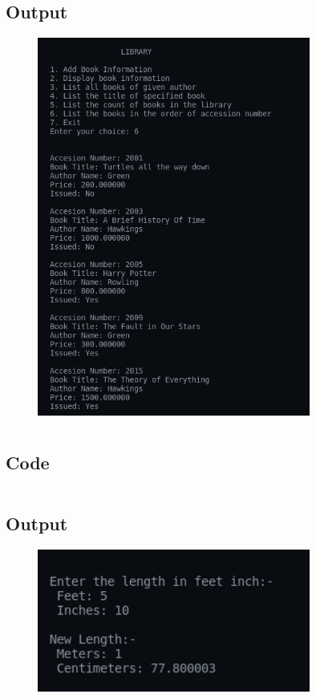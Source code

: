 \documentclass[12pt]{article}
\begin{document}
\subsection{Output}
\begin{figure}[h]
    \centering
    \includegraphics[width=0.8\textwidth]{4.png}
\end{figure}

\newpage
\section{}
\subsection{Code}
\inputminted{c}{q5.c}
\newpage
\subsection{Output}
\begin{figure}[h]
    \centering
    \includegraphics[width=0.8\textwidth]{5.png}
\end{figure}
\end{document}
